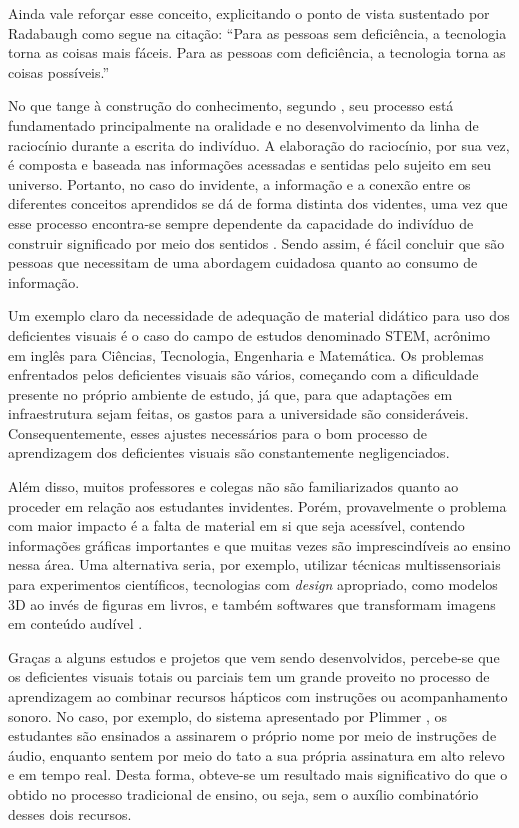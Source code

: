 Ainda vale reforçar esse conceito, explicitando o ponto de vista sustentado por Radabaugh  como segue na citação: ``Para as pessoas sem deficiência, a tecnologia torna as coisas mais fáceis. Para as pessoas com deficiência, a tecnologia torna as coisas possíveis.''


No que tange à construção do conhecimento, segundo , seu processo está fundamentado principalmente na oralidade e no desenvolvimento da linha de raciocínio durante a escrita do indivíduo. A elaboração do raciocínio, por sua vez, é composta e baseada nas informações acessadas e sentidas pelo sujeito em seu universo. Portanto, no caso do invidente, a informação e a conexão entre os diferentes conceitos aprendidos se dá de forma distinta dos videntes, uma vez que esse processo encontra-se sempre dependente da capacidade do indivíduo de construir significado por meio dos sentidos . Sendo assim, é fácil concluir que são pessoas que necessitam de uma abordagem cuidadosa quanto ao consumo de informação.

Um exemplo claro da necessidade de adequação de material didático para uso dos deficientes visuais é o caso do campo de estudos denominado STEM, acrônimo em inglês para Ciências, Tecnologia, Engenharia e Matemática. Os problemas enfrentados pelos deficientes visuais são vários, começando com a dificuldade presente no próprio ambiente de estudo, já que, para que adaptações em infraestrutura sejam feitas, os gastos para a universidade são consideráveis. Consequentemente, esses ajustes necessários para o bom processo de aprendizagem dos deficientes visuais são constantemente negligenciados.

Além disso, muitos professores e colegas não são familiarizados quanto ao proceder em relação aos estudantes invidentes. Porém, provavelmente o problema com maior impacto é a falta de material em si que seja acessível, contendo informações gráficas importantes e que muitas vezes são imprescindíveis ao ensino nessa área. Uma alternativa seria, por exemplo, utilizar técnicas multissensoriais para experimentos científicos, tecnologias com \textit{design} apropriado, como modelos 3D ao invés de figuras em livros, e também softwares que transformam imagens em conteúdo audível .

Graças a alguns estudos e projetos que vem sendo desenvolvidos, percebe-se que os deficientes visuais totais ou parciais tem um grande proveito no processo de aprendizagem ao combinar recursos hápticos com instruções ou acompanhamento sonoro. No caso, por exemplo, do sistema apresentado por Plimmer , os estudantes são ensinados a assinarem o próprio nome por meio de instruções de áudio, enquanto sentem por meio do tato a sua própria assinatura em alto relevo e em tempo real. Desta forma, obteve-se um resultado mais significativo do que o obtido no processo tradicional de ensino, ou seja, sem o auxílio combinatório desses dois recursos.

